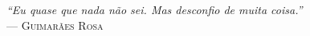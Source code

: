 {\sffamily\itshape
``Eu quase que nada não sei. Mas desconfio de muita coisa.''\\}
--- \textsc{Guimar{\~a}es Rosa}
